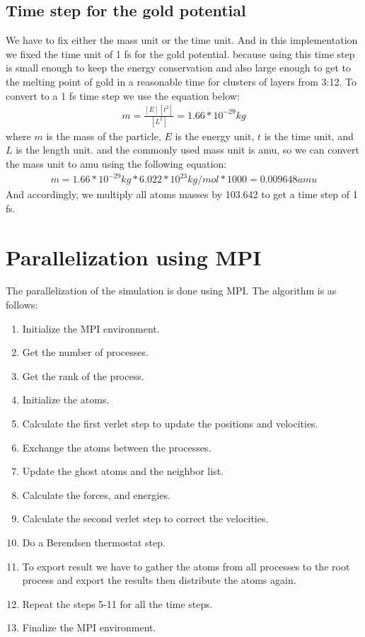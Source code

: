     \subsection{Time step for the gold potential}
    We have to fix either the mass unit or the time unit. And in this implementation we fixed the time unit of 1 fs for the gold potential. because using this time step is small enough to keep the energy conservation and also large enough to get to the melting point of gold in a reasonable time for clusters of layers from 3:12. To convert to a 1 fs time step we use the equation below: 
    \begin{equation}
    \label{eq:time_step}
        \begin{aligned}
            m = \frac{[E][t^2]}{[L^2]} = 1.66*10^{-29} kg
        \end{aligned}
    \end{equation}
    where $m$ is the mass of the particle, $E$ is the energy unit, $t$ is the time unit, and $L$ is the length unit.
    and the commonly used mass unit is amu, so we can convert the mass unit to amu using the following equation:
    \begin{equation}
    \label{eq:amu}
        \begin{aligned}
            m = 1.66*10^{-29} kg * 6.022*10^{23} kg/mol * 1000 = 0.009648 amu
        \end{aligned}
    \end{equation}
    And accordingly, we multiply all atoms masses by 103.642 to get a time step of 1 fs.


\section{Parallelization using MPI}
The parallelization of the simulation is done using MPI. The algorithm is as follows:
\begin{enumerate}
    \item Initialize the MPI environment.
    \item Get the number of processes.
    \item Get the rank of the process.
    \item Initialize the atoms.
    \item Calculate the first verlet step to update the positions and velocities.
    \item Exchange the atoms between the processes.
    \item Update the ghost atoms and the neighbor list.
    \item Calculate the forces, and energies.

    \item Calculate the second verlet step to correct the velocities.
    \item Do a Berendsen thermostat step.
    \item To export result we have to gather the atoms from all processes to the root process and export the results then distribute the atoms again.
    \item Repeat the steps 5-11 for all the time steps.
    \item Finalize the MPI environment.
\end{enumerate}
